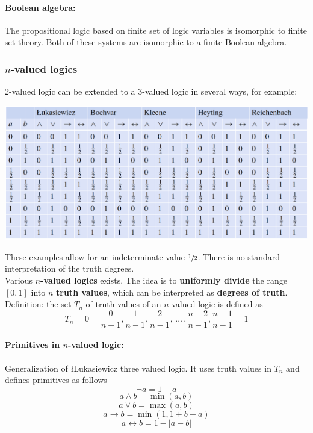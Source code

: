 \documentclass[11pt]{article}
\begin{document}
		\paragraph{Boolean algebra:} The propositional logic based on finite set of logic variables is isomorphic to finite set theory. Both of these systems are isomorphic to a finite Boolean algebra. %
		
		\newpage
		
		\subsubsection{$n$-valued logics}
		
		 2-valued logic can be extended to a 3-valued logic in several ways, for example: 
		 \begin{center}
		 	\includegraphics[width=0.95\columnwidth]{img/FS/nlogic}
		 \end{center}
		These examples allow for an indeterminate value $\sfrac{1}{2}$. There is no standard interpretation of the truth degrees.\\
		
		Various \textbf{$n$-valued logics} exists. The idea is to \textbf{uniformly divide} the range $[0,1]$ into $n$ \textbf{truth values}, which can be interpreted as \textbf{degrees of truth}. Definition: the set $T_n$ of truth values of an $n$-valued logic is defined as
		$$ T_n = {0 = \frac{0}{n-1}, \frac{1}{n-1}, \frac{2}{n-1}, \, \dots \, , \frac{n-2}{n-1}, \frac{n-1}{n-1} = 1} $$
		
		\paragraph{Primitives in $n$-valued logic:} Generalization of \l{L}ukasiewicz three valued logic. It uses truth values in $T_n$ and defines primitives as follows
		$$ \neg a = 1 - a $$
		$$ a \wedge b = \min (a,b) $$
		$$ a \vee b = \max(a,b) $$
		$$ a \rightarrow b = \min(1, 1 + b - a) $$
		$$ a \leftrightarrow b = 1 - |a - b| $$
		
\end{document}
